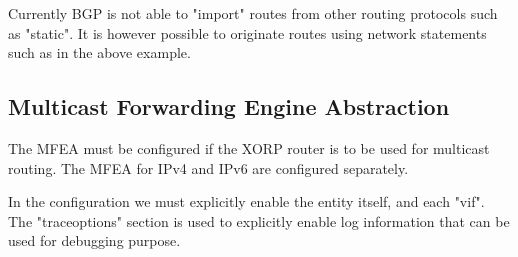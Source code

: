 \documentclass[11pt]{article}
\begin{document}
Currently BGP is not able to "import" routes from other routing
protocols such as "static". It is however possible to originate routes
using network statements such as in the above example.

\subsection{Multicast Forwarding Engine Abstraction}

The MFEA must be configured if the XORP router is to be used for multicast
routing. The MFEA for IPv4 and IPv6 are configured separately.

In the configuration we must explicitly enable the entity itself, and
each "vif". The "traceoptions" section is used to explicitly enable
log information that can be used for debugging purpose.
\end{document}
